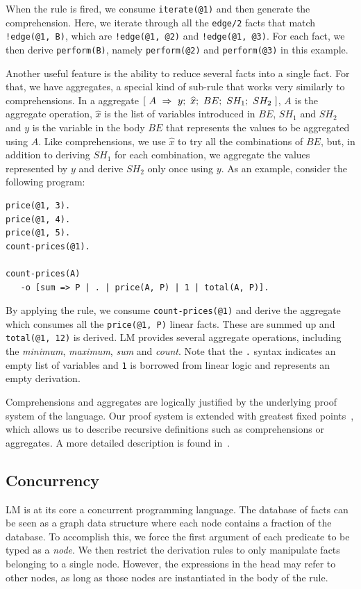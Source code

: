 \documentclass{sigplanconf}
\begin{document}
When the rule is fired, we consume \texttt{iterate(@1)} and then
generate the comprehension. Here, we iterate through all the
\texttt{edge/2} facts that match \texttt{!edge(@1, B)}, which are
\texttt{!edge(@1, @2)} and \texttt{!edge(@1, @3)}. For each fact, we
then derive \texttt{perform(B)}, namely \texttt{perform(@2)} and
\texttt{perform(@3)} in this example.

Another useful feature is the ability to reduce several facts into a
single fact. For that, we have aggregates, a special kind of sub-rule
that works very similarly to comprehensions. In a aggregate
$[~A~\Rightarrow~y;~\widehat{x};~BE;~SH_1;~SH_2~]$, $A$ is the aggregate operation, $\widehat{x}$ is the
list of variables introduced in $BE$, $SH_1$ and $SH_2$ and $y$ is the
variable in the body $BE$ that represents the values to be aggregated
using $A$. Like comprehensions, we use $\widehat{x}$ to try all the
combinations of $BE$, but, in addition to deriving $SH_1$ for each
combination, we aggregate the values represented by $y$ and derive
$SH_2$ only once using $y$. As an example, consider the following
program:

{\footnotesize
\begin{Verbatim}
price(@1, 3).
price(@1, 4).
price(@1, 5).
count-prices(@1).

count-prices(A)
   -o [sum => P | . | price(A, P) | 1 | total(A, P)].
\end{Verbatim}
}

By applying the rule, we consume \texttt{count-prices(@1)} and derive
the aggregate which consumes all the \texttt{price(@1, P)} linear
facts. These are summed up and \texttt{total(@1,~12)} is derived. LM
provides several aggregate operations, including the \emph{minimum},
\emph{maximum}, \emph{sum} and \emph{count}. Note that the \texttt{.} syntax indicates
an empty list of variables and \texttt{1} is borrowed from linear logic
and represents an empty derivation.

Comprehensions and aggregates are logically justified by the underlying
proof system of the language. Our proof system is extended with greatest
fixed points~\cite{Baelde:2012:LGF:2071368.2071370}, which allows us to describe
recursive definitions such as comprehensions or aggregates.
A more detailed description is found in~\cite{cruz-iclp14}.


\subsection{Concurrency}

LM is at its core a concurrent programming language. The database of
facts can be seen as a graph data structure where each node contains a
fraction of the database.  To accomplish this, we force the first
argument of each predicate to be typed as a \emph{node}. We then
restrict the derivation rules to only manipulate facts belonging to a
single node.  However, the expressions in the head may refer to other
nodes, as long as those nodes are instantiated in the body of the
rule.
\end{document}
